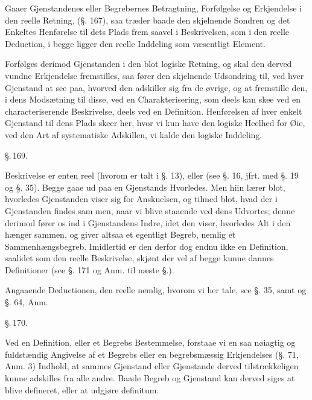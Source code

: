 \documentclass[12pt]{book}
\makeatletter
\def\sperr#1{#1}%
\def\textit#1{#1}%
\def\emph#1{#1}%
\newcommand{\sperr}[1]{\textls[180]{#1}}
\newcommand{\umph}[2][misc]{%
  \@ifundefined{umph@#1@on}{#2}{\emph{#2}}}
\newcommand{\parag}[1]{%
  \par\vspace{0.9\baselineskip}%
  {\centering\textit{\S.\,#1.}\par}%
  \vspace{0.35\baselineskip}%
  \noindent\hspace{\parindent}\ignorespaces
}
\newcommand{\opage}[1]{\marginnote{\footnotesize\textit{[#1]}}}
\makeatother
\begin{document}
Gaaer Gjenstandenes eller Begrebernes Betragtning, Forfølgelse og Erkjendelse i
den reelle Retning, (§. 167), saa træder baade den skjelnende Sondren og det
Enkeltes Henførelse til dets Plads frem saavel i Beskrivelsen, som i den reelle
Deduction, i begge ligger den reelle Inddeling som væsentligt Element.

Forfølges derimod Gjenstanden i den blot logiske Retning, og skal den derved
vundne Erkjendelse fremstilles, saa fører den skjelnende Udsondring til, ved
hver Gjenstand at see paa, hvorved den adskiller sig fra de øvrige, og at
fremstille den, i dens Modsætning til disse, ved en Charakterisering, som deels
kan skee ved en characteriserende Beskrivelse, deels ved en Definition.
Henførelsen af hver enkelt Gjenstand til dens Plads skeer her, hvor vi kun have
den logiske Heelhed for Øie, ved den Art af systematiske Adskillen, vi kalde
den logiske Inddeling.

\parag{169}

Beskrivelse er enten reel (hvorom er talt i §. 13), eller
\umph[schwab]{intellectuel} (see §. 16, jfrt. med §. 19 og §. 35). Begge gaae
ud paa en Gjenstands Hvorledes. Men hiin lærer blot, hvorledes Gjenstanden
viser sig for Anskuelsen, og tilmed blot, hvad der i Gjenstanden findes sam%
\opage{368}%
men, naar vi blive staaende ved dens Udvortes; denne derimod fører os ind i
Gjenstandens Indre, idet den viser, hvorledes Alt i den hænger sammen, og giver
altsaa et egentligt Begreb, nemlig et Sammenhængsbegreb. Imidlertid er den
derfor dog endnu ikke en Definition, saalidet som den reelle Beskrivelse,
skjønt der vel af begge kunne dannes Definitioner (see §. 171 og Anm. til næste
§.).

Angaaende Deductionen, den reelle nemlig, hvorom vi her tale, see §. 35, samt
og §. 64, Anm.

\parag{170}

Ved en Definition, eller et Begrebs Bestemmelse, forstaae vi en saa nøiagtig og
fuldstændig Angivelse af et Begrebs eller en begrebsmæssig Erkjendelses (§. 71,
Anm. 3) Indhold, at sammes Gjenstand eller Gjenstande derved tilstrækkeligen
kunne adskilles fra alle andre. Baade Begreb og Gjenstand kan derved siges at
blive defineret, eller at udgjøre \textit{definitum}.
\end{document}
